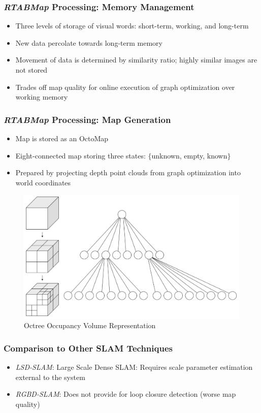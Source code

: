 \documentclass{beamer}
\begin{document}
\begin{frame}
\frametitle{\textit{RTABMap} Processing: Memory Management}
\begin{itemize}
\item{Three levels of storage of visual words: short-term, working, and long-term}
\item{New data percolate towards long-term memory}
\item{Movement of data is determined by similarity ratio; highly similar images are not stored}
\item{Trades off map quality for online execution of graph optimization over working memory}
\end{itemize}
\end{frame}

\begin{frame}
\frametitle{\textit{RTABMap} Processing: Map Generation}
\vspace{1.6\baselineskip}
\begin{itemize}
\item{Map is stored as an OctoMap}
\item{Eight-connected map storing three states: $\{$unknown, empty, known$\}$}
\item{Prepared by projecting depth point clouds from graph optimization into world coordinates}
\end{itemize}
\begin{figure}
\includegraphics[width=0.6\linewidth]{figures/octree}
\caption{Octree Occupancy Volume Representation}
\end{figure}
\end{frame}

\begin{frame}
\frametitle{Comparison to Other SLAM Techniques}
\begin{itemize}
\item{\textit{LSD-SLAM}: Large Scale Dense SLAM: Requires scale parameter estimation external to the system}
\item{\textit{RGBD-SLAM}: Does not provide for loop closure detection (worse map quality)}
\end{itemize}
\end{frame}
\end{document}
